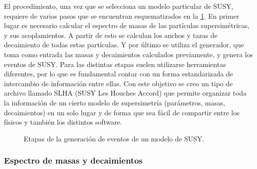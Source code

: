 El procedimiento, una vez que se selecciona un modelo particular de SUSY,
requiere de varios pasos que se encuentran esquematizados en la
\cref{fig:mc_sketch}. En primer lugar es necesario calcular el espectro de masas
de las partículas supersimétricas, y sus acoplamientos. A partir de esto se
calculan los anchos y tazas de decaimiento de todas estas partículas. Y por
último se utiliza el generador, que toma como entrada las masas y decaimientos
calculados previamente, y genera los eventos de SUSY. Para las distintas etapas
suelen utilizarse herramientas diferentes, por lo que es fundamental contar con
un forma estandarizada de intercambio de información entre ellas. Con este
objetivo se creo un tipo de archivo llamado SLHA (SUSY Les Houches
Accord)\cite{SLHA} que permite organizar toda la información de un cierto modelo
de supersimetría (parámetros, masas, decaimientos) en un solo lugar y de forma
que sea fácil de compartir entre los físicos y también los distintos software.

\begin{figure}[h]
  \centering
  \scalebox{0.8}{}
  \caption{Etapas de la generación de eventos de un modelo de SUSY.}
  \label{fig:mc_sketch}
\end{figure}






\subsubsection{Espectro de masas y decaimientos}


